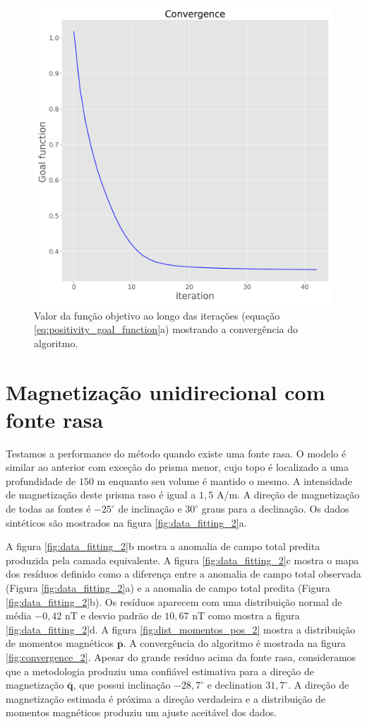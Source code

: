 \begin{figure}
	\centering
	\includegraphics[width=.9\textwidth]{Fig/eqlayer/unidir_test/convergence_LM_NNLS_magRM.png}
	\caption{Valor da função objetivo ao longo das iterações (equação \ref{eq:positivity_goal_function}a) mostrando a convergência do algoritmo.}
	\label{fig:convergence_1}
\end{figure}


\section{Magnetização unidirecional com fonte rasa}

Testamos a performance do método quando existe uma fonte rasa. O modelo é similar ao anterior com exceção do prisma menor, cujo topo é localizado a uma profundidade de $150$ m enquanto seu volume é mantido o mesmo. A intensidade de magnetização deste prisma raso é igual a $1,5$ A/m. A direção de magnetização de todas as fontes é $-25^\circ$ de inclinação e $30^\circ$ graus para a declinação. Os dados sintéticos são mostrados na figura \ref{fig:data_fitting_2}a.

A figura \ref{fig:data_fitting_2}b mostra a anomalia de campo total predita produzida pela camada equivalente. A figura \ref{fig:data_fitting_2}c mostra o mapa dos resíduos definido como a diferença entre a anomalia de campo total observada (Figura \ref{fig:data_fitting_2}a) e a anomalia de campo total predita (Figura \ref{fig:data_fitting_2}b). Os resíduos aparecem com uma distribuição normal de média $-0,42$ nT e desvio padrão de $10,67$ nT como mostra a figura \ref{fig:data_fitting_2}d. A figura \ref{fig:dist_momentos_pos_2} mostra a distribuição de momentos magnéticos $\bar{\mathbf{p}}$. A convergência do algoritmo é mostrada na figura \ref{fig:convergence_2}. Apesar do grande resíduo acima da fonte rasa, consideramos que a metodologia produziu uma confiável estimativa para a direção de magnetização $\bar{\mathbf{q}}$, que possui inclinação $-28,7^\circ$ e declination $31,7^\circ$. A direção de magnetização estimada é próxima a direção verdadeira e a distribuição de momentos magnéticos produziu um ajuste aceitável dos dados. 

